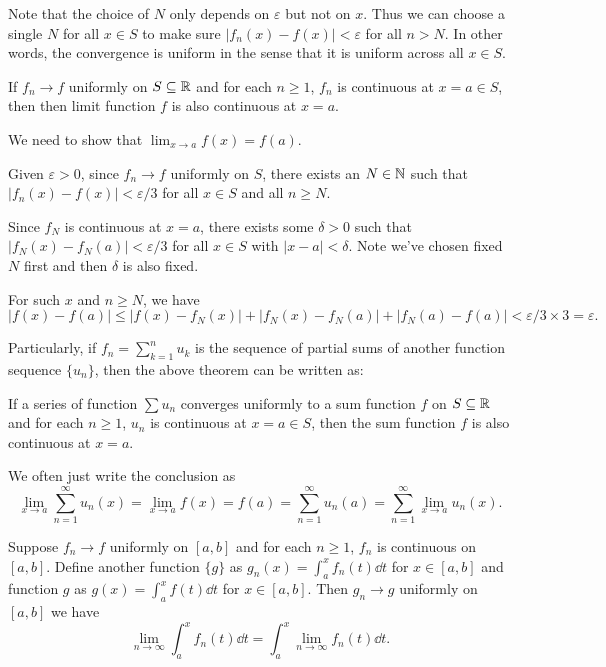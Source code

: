     \begin{remarkenv}
        Note that the choice of $N$ only depends on $\varepsilon$ but not on $x$. Thus we can choose a single $N$ for all $x\in S$ to make sure $|f_n(x) - f(x)| < \varepsilon$ for all $n > N$. In other words, the convergence is uniform in the sense that it is uniform across all $x\in S$.
    \end{remarkenv}
    \begin{theoremenv}
        If $f_n \to f$ uniformly on $S\subseteq \mathbb{R}$ and for each $n\ge 1$, $f_n$ is continuous at $x=a \in S$, then then limit function $f$ is also continuous at $x=a$.
    \end{theoremenv}
    \begin{proofenv}
        We need to show that $\displaystyle \lim_{x\to a} f(x) = f(a)$. 

        Given $\varepsilon >0$, since $f_n \to f$ uniformly on $S$, there exists an $N\in \mathbb{N}$ such that $|f_n(x) - f(x)| < \varepsilon/3$ for all $x\in S$ and all $n \ge N$.

        Since $f_N$ is continuous at $x=a$, there exists some $\delta >0$ such that $|f_N(x) - f_N(a)| < \varepsilon/3$ for all $x\in S$ with $|x-a| < \delta$. Note we've chosen fixed $N$ first and then $\delta$ is also fixed. 

        For such $x$ and $n\ge N$, we have
        \[
        |f(x) - f(a)| \le |f(x) - f_N(x)| + |f_N(x) - f_N(a)| + |f_N(a) - f(a)| < \varepsilon/3 \times 3 = \varepsilon.
        \]
    \end{proofenv}
    \begin{propositionenv}
        Particularly, if $f_n=\displaystyle \sum_{k=1}^n u_k$ is the sequence of partial sums of another function sequence $\{u_n\}$, then the above theorem can be written as:

        If a series of function $\displaystyle \sum u_n$ converges uniformly to a sum function $f$ on $S\subseteq \mathbb{R}$ and for each $n\ge 1$, $u_n$ is continuous at $x=a \in S$, then the sum function $f$ is also continuous at $x=a$.

        We often just write the conclusion as
        \[
        \lim_{x\to a} \sum_{n=1}^\infty u_n(x) = \lim_{x\to a} f(x) = f(a)= \sum_{n=1}^\infty u_n(a) = \sum_{n=1}^\infty \lim_{x\to a} u_n(x).
        \]
    \end{propositionenv}
    \begin{theoremenv}
        Suppose $f_n \to f$ uniformly on $[a,b]$ and for each $n\ge 1$, $f_n$ is continuous on $[a,b]$. Define another function $\{g\}$ as $g_n(x) = \displaystyle \int _a^x f_n(t) \dd t$ for $x\in [a,b]$ and function $g$ as $g(x) = \displaystyle \int_a^x f(t) \dd t$ for $x\in [a,b]$. Then $g_n \to g$ uniformly on $[a,b]$ we have
        \[
        \lim_{n\to \infty} \int_a^x f_n(t) \dd t = \int_a^x \lim_{n\to \infty} f_n(t) \dd t.
        \]
    \end{theoremenv}
